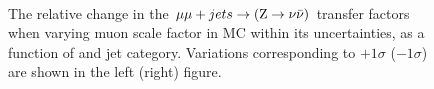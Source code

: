 \begin{figure}[!h]
  \centering
   ~~
  \\

  \caption{\label{fig:tfSyst_muon scale factor_mumuToZinv} The relative change in
  the $\mu\mu + jets \rightarrow ({\text Z} \rightarrow \nu\bar{\nu})$ transfer
  factors when varying muon scale factor in MC within its uncertainties, as a function of \scalht and jet category. 
  Variations corresponding to $+1\sigma$ ($-1\sigma$) are shown in the left (right) figure. 
  }
\end{figure}


